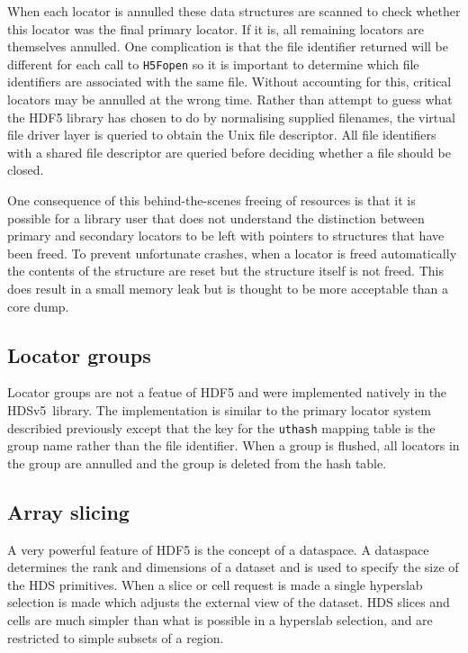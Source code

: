 \documentclass[final,authoryear,5p,times,twocolumn]{elsarticle}
\newcommand{\new}{HDSv5}
\begin{document}
When each locator is annulled these data structures are scanned to
check whether this locator was the final primary locator. If it is,
all remaining locators are themselves annulled. One complication is
that the file identifier returned will be different for each call to
\texttt{H5Fopen} so it is important to determine which file
identifiers are associated with the same file. Without accounting for
this, critical locators may be annulled at the wrong time. Rather than
attempt to guess what the HDF5 library has chosen to do by normalising
supplied filenames, the virtual file driver layer is queried to obtain
the Unix file descriptor. All file identifiers with a shared file
descriptor are queried before deciding whether a file should be
closed.

One consequence of this behind-the-scenes freeing of resources is that
it is possible for a library user that does not understand the
distinction between primary and secondary locators to be left with
pointers to structures that have been freed. To prevent unfortunate
crashes, when a locator is freed automatically the contents of the
structure are reset but the structure itself is not freed. This does
result in a small memory leak but is thought to be more acceptable
than a core dump.

\subsection{Locator groups}

Locator groups are not a featue of HDF5 and were implemented natively
in the \new\ library. The implementation is similar to the primary
locator system describied previously except that the key for the
\texttt{uthash} mapping table is the group name rather than the file
identifier. When a group is flushed, all locators in the group are
annulled and the group is deleted from the hash table.

\subsection{Array slicing}

A very powerful feature of HDF5 is the concept of a dataspace. A
dataspace determines the rank and dimensions of a dataset and is used
to specify the size of the HDS primitives. When a slice or cell request is
made a single hyperslab selection is made which adjusts the external
view of the dataset. HDS slices and cells are much simpler than what
is possible in a hyperslab selection, and are restricted to simple
subsets of a region.
\end{document}
